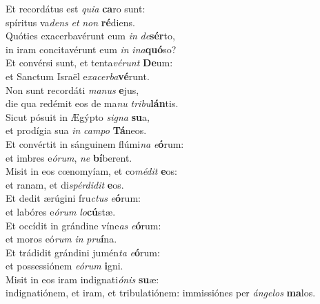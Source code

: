 \evenverse Et recordátus est \textit{qui}\textit{a} \textbf{ca}ro sunt:~\*\\
\evenverse spíritus va\textit{dens} \textit{et} \textit{non} \textbf{ré}diens.\\
\oddverse Quóties exacerbavérunt eum \textit{in} \textit{de}\textbf{sér}to,~\*\\
\oddverse in iram concitavérunt eum \textit{in} \textit{i}\textit{na}\textbf{quó}so?\\
\evenverse Et convérsi sunt, et tenta\textit{vé}\textit{runt} \textbf{De}um:~\*\\
\evenverse et Sanctum Israël e\textit{xa}\textit{cer}\textit{ba}\textbf{vé}runt.\\
\oddverse Non sunt recordáti \textit{ma}\textit{nus} \textbf{e}jus,~\*\\
\oddverse die qua redémit eos de ma\textit{nu} \textit{tri}\textit{bu}\textbf{lán}tis.\\
\evenverse Sicut pósuit in Ægýpto \textit{si}\textit{gna} \textbf{su}a,~\*\\
\evenverse et prodígia sua \textit{in} \textit{cam}\textit{po} \textbf{Tá}neos.\\
\oddverse Et convértit in sánguinem flúmi\textit{na} \textit{e}\textbf{ó}rum:~\*\\
\oddverse et imbres e\textit{ó}\textit{rum}, \textit{ne} \textbf{bí}berent.\\
\evenverse Misit in eos cœnomyíam, et co\textit{mé}\textit{dit} \textbf{e}os:~\*\\
\evenverse et ranam, et di\textit{spér}\textit{di}\textit{dit} \textbf{e}os.\\
\oddverse Et dedit ærúgini fru\textit{ctus} \textit{e}\textbf{ó}rum:~\*\\
\oddverse et labóres e\textit{ó}\textit{rum} \textit{lo}\textbf{cú}stæ.\\
\evenverse Et occídit in grándine víne\textit{as} \textit{e}\textbf{ó}rum:~\*\\
\evenverse et moros eó\textit{rum} \textit{in} \textit{pru}\textbf{í}na.\\
\oddverse Et trádidit grándini jumén\textit{ta} \textit{e}\textbf{ó}rum:~\*\\
\oddverse et possessiónem \textit{e}\textit{ó}\textit{rum} \textbf{i}gni.\\
\evenverse Misit in eos iram indignati\textit{ó}\textit{nis} \textbf{su}æ:~\*\\
\evenverse indignatiónem, et iram, et tribulatiónem: immissiónes per \textit{án}\textit{ge}\textit{los} \textbf{ma}los.\\
